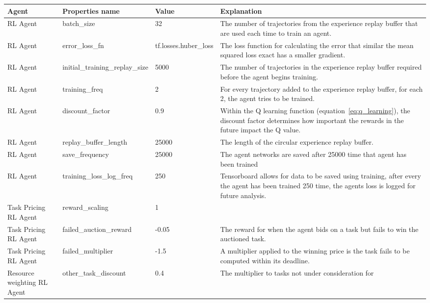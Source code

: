\begin{longtable}{|p{3.5cm}|p{5cm}|p{3.5cm}|p{3.5cm}|} \hline
    \textbf{Agent} & \textbf{Properties name} & \textbf{Value} & \textbf{Explanation} \\ \hline
        RL Agent & batch\_size & 32 & The number of trajectories from the experience replay buffer that are used each
            time to train an agent. \\ \hline
        RL Agent & error\_loss\_fn & tf.losses.huber\_loss & The loss function for calculating the error that similar
            the mean squared loss exact has a smaller gradient. \\ \hline
        RL Agent & initial\_training\_replay\_size & 5000 & The number of trajectories in the experience replay buffer
            required before the agent begins training. \\ \hline
        RL Agent & training\_freq & 2 & For every trajectory added to the experience replay buffer, for each 2, the
            agent tries to be trained. \\ \hline
        RL Agent & discount\_factor & 0.9 & Within the Q learning function (equation~\eqref{eq:q_learning}), the
            discount factor determines how important the rewards in the future impact the Q value. \\ \hline
        RL Agent & replay\_buffer\_length & 25000 & The length of the circular experience replay buffer. \\ \hline
        RL Agent & save\_frequency & 25000 & The agent networks are saved after 25000 time that agent has been trained
            \\ \hline
        RL Agent & training\_loss\_log\_freq & 250 & Tensorboard allows for data to be saved using training, after every
            the agent has been trained 250 time, the agents loss is logged for future analysis. \\ \hline \hline
        Task Pricing RL Agent & reward\_scaling & 1 & \\ \hline
        Task Pricing RL Agent & failed\_auction\_reward & -0.05 & The reward for when the agent bids on a task but fails
            to win the auctioned task. \\ \hline
        Task Pricing RL Agent & failed\_multiplier & -1.5 & A multiplier applied to the winning price is the task fails
            to be computed within its deadline. \\ \hline \hline
        Resource weighting RL Agent & other\_task\_discount & 0.4 & The multiplier to tasks not under consideration for

\end{longtable}
